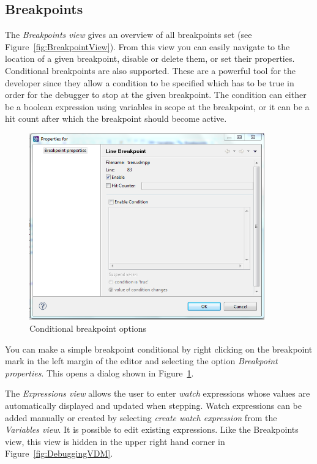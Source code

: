 \subsection{Breakpoints}
The \emph{Breakpoints view} gives an overview of all breakpoints set (see Figure~\ref{fig:BreakpointView}). From this view you can easily navigate to the location of a given breakpoint, disable or delete them, or set their properties.
Conditional breakpoints are also supported. These are a powerful tool for the developer since they allow a condition to be specified which has to be true in order for the debugger to stop at the given breakpoint. The condition can either be a boolean expression using variables in scope at the breakpoint, or it can be a hit count after which the breakpoint should become active.
%
\begin{figure}[htp]
\begin{center}
  \includegraphics[width=4in]{figures/Breakpointconditional}
  \caption{Conditional breakpoint options}
  \label{fig:BreakpointConditional}
\end{center}
\end{figure}
%
You can make a simple breakpoint conditional by right clicking on the breakpoint mark in the left margin of the editor and selecting the option \emph{Breakpoint properties}. This opens a dialog shown in Figure~\ref{fig:BreakpointConditional}.

The \emph{Expressions view} allows the user to enter \emph{watch} expressions whose values are automatically displayed and updated when stepping. Watch expressions can be added manually or created by selecting \emph{create watch expression} from the \emph{Variables view}. It is possible to edit existing expressions.  Like the Breakpoints view, this view is hidden in the upper right hand corner in Figure~\ref{fig:DebuggingVDM}.

